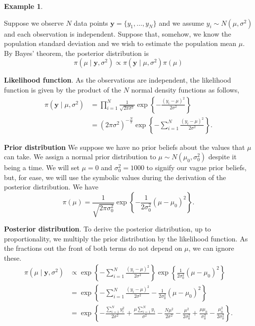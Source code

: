 \documentclass[
]{book}
\theoremstyle{definition}
\theoremstyle{definition}
\newtheorem{example}{Example}[chapter]
\theoremstyle{definition}
\theoremstyle{definition}
\theoremstyle{remark}
\begin{document}
\begin{example}
\protect\hypertarget{exm:normal}{}\label{exm:normal}

Suppose we observe \(N\) data points \(\boldsymbol{y} = \{y_1, \ldots, y_N\}\) and we assume \(y_i \sim N(\mu, \sigma^2)\) and each observation is independent. Suppose that, somehow, we know the population standard deviation and we wish to estimate the population mean \(\mu\). By Bayes' theorem, the posterior distribution is
\[
\pi(\mu \mid \boldsymbol{y}, \sigma^2) \propto \pi(\boldsymbol{y} \mid \mu, \sigma^2) \pi(\mu)
\]

\textbf{Likelihood function}.
As the observations are independent, the likelihood function is given by the product of the \(N\) normal density functions as follows,
\begin{align*}
\pi(\boldsymbol{y} \mid \mu, \sigma^2) &= \prod_{i=1}^{N} \frac{1}{\sqrt{2\pi\sigma^2}}\exp\left\{-\frac{(y_i - \mu)^2}{2\sigma^2}\right\} \\
&= (2\pi\sigma^2)^{-\frac{N}{2}}\exp\left\{-\sum_{i=1}^{N}\frac{(y_i - \mu)^2}{2\sigma^2}\right\}.
\end{align*}

\textbf{Prior distribution} We suppose we have no prior beliefs about the values that \(\mu\) can take. We assign a normal prior distribution to \(\mu \sim N(\mu_0, \sigma_0^2)\) despite it being a time. We will set \(\mu = 0\) and \(\sigma_0^2 = 1000\) to signify our vague prior beliefs, but, for ease, we will use the symbolic values during the derivation of the posterior distribution. We have
\[
\pi(\mu) = \frac{1}{\sqrt{2\pi\sigma_0^2}}\exp\left\{-\frac{1}{2\sigma_0^2}(\mu - \mu_0)^2\right\}.
\]

\textbf{Posterior distribution}. To derive the posterior distribution, up to proportionality, we multiply the prior distribution by the likelihood function. As the fractions out the front of both terms do not depend on \(\mu\), we can ignore these.
\begin{align*}
\pi(\mu \mid \boldsymbol{y}, \sigma^2) &\propto\exp\left\{-\sum_{i=1}^{N}\frac{(y_i - \mu)^2}{2\sigma^2}\right\}  \exp\left\{\frac{1}{2\sigma_0^2}(\mu - \mu_0)^2\right\} \\
& = \exp\left\{-\sum_{i=1}^{N}\frac{(y_i - \mu)^2}{2\sigma^2}-\frac{1}{2\sigma_0^2}(\mu - \mu_0)^2\right\} \\
& = \exp\left\{-\frac{\sum_{i=1}^{N}y_i^2}{2\sigma^2} + \frac{\mu\sum_{i=1}^{N}y_i}{\sigma^2} - \frac{N\mu^2}{2\sigma^2} - \frac{\mu^2}{2\sigma_0^2} + \frac{\mu\mu_0}{\sigma_0^2} - \frac{\mu_0^2}{2\sigma_0^2}\right\}.
\end{align*}


\end{example}
\end{document}

